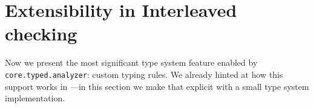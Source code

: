 


\section{Extensibility in Interleaved checking}

Now we present the most significant type system feature
enabled by \texttt{core.typed.analyzer}: custom typing rules.
We already hinted at how this support works in
---in this section
we make that explicit with a small type system implementation.

